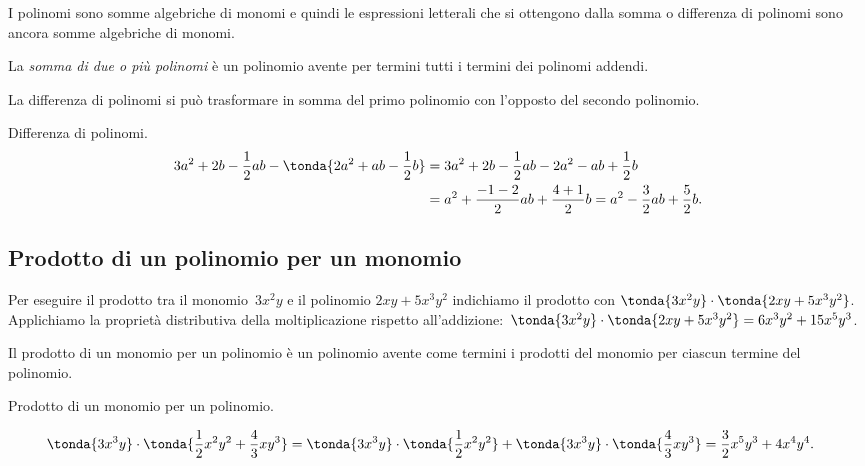 I polinomi sono somme algebriche di monomi e quindi le espressioni 
letterali che si ottengono dalla somma
o differenza di polinomi sono ancora somme algebriche di monomi.

\begin{definizione}
La \emph{somma di due o più polinomi} è un polinomio avente per termini 
tutti i termini dei polinomi addendi.
\end{definizione}

La differenza di polinomi si può trasformare in somma del primo polinomio 
con l'opposto del secondo polinomio.

\begin{esempio}
Differenza di polinomi.
\begin{equation*}
\begin{split}
3a^2+2b-\frac{1}{2}ab-\tonda{2a^2+ab-\frac{1}{2}b}&=3a^2+2b-\frac{1}{2}
ab-2a^2-ab+\frac{1}{2}b\\
&=a^2+\frac{-1-2}{2}ab+\frac{4+1}{2}b=
a^2-\frac{3}{2}ab+\frac{5}{2}b.
\end{split}
\end{equation*}
\end{esempio}


\subsection{Prodotto di un polinomio per un monomio}
\label{subsec:10_poli_prodottopermonomio}

Per eseguire il prodotto tra il monomio~\(3x^{2}y\) e il polinomio
\(2{xy}+5x^{3}y^{2}\) indichiamo il prodotto con
\(\tonda{3x^{2}y}\cdot \tonda{2{xy}+5x^{3}y^{2}}\).
Applichiamo la proprietà distributiva della moltiplicazione rispetto
all'addizione:~\(\tonda{3x^{2}y}\cdot
\tonda{2{xy}+5x^{3}y^{2}}=6x^{3}y^{2}+15x^{5}y^{3}\).

\osservazione Il prodotto di un monomio per un polinomio è
un polinomio avente come termini i prodotti del monomio per ciascun
termine del polinomio.

 \begin{esempio}
 Prodotto di un monomio per un polinomio.

 \begin{equation*}
\begin{split}
\tonda{3x^{3}y}\cdot\tonda{\frac{1}{2}x^{2}y^{2}+\frac{4}{3}{xy}^{3}
}&=\tonda{3x^{3}y}\cdot\tonda{\frac{1}{2}x^{2}y^{2}
}+\tonda{3x^{3}y}\cdot%
\tonda{\frac{4}{3}{xy}^{3}}
=\frac{3}{2}x^{5}y^{3}+4x^{4}y^{4}.
\end{split}
\end{equation*}
 \end{esempio}

